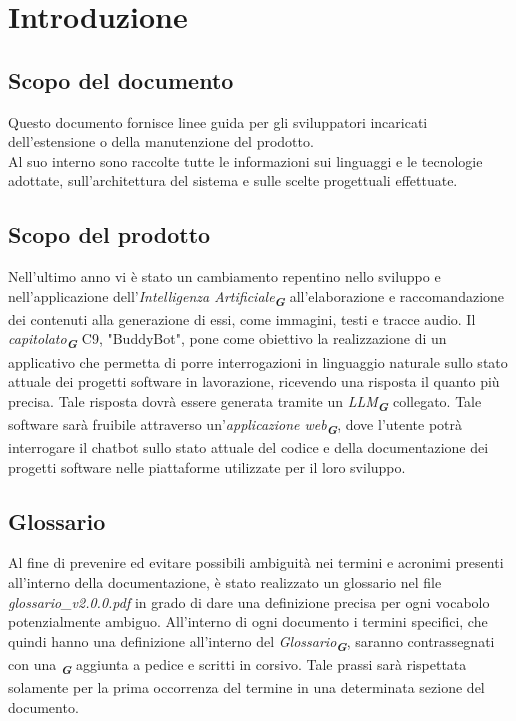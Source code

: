 

\section{Introduzione}
\label{sec:introduzione}

\subsection{Scopo del documento}
Questo documento fornisce linee guida per gli sviluppatori incaricati dell'estensione o della manutenzione del prodotto.\\
Al suo interno sono raccolte tutte le informazioni sui linguaggi e le tecnologie adottate, sull’architettura del sistema e sulle
scelte progettuali effettuate.

\subsection{Scopo del prodotto}
Nell’ultimo anno vi è stato un cambiamento repentino nello sviluppo e nell’applicazione
dell’\emph{Intelligenza Artificiale}\textsubscript{\textbf{\textit{G}}} all’elaborazione e raccomandazione dei contenuti alla
generazione
di essi, come immagini, testi e tracce audio.
Il \emph{capitolato}\textsubscript{\textbf{\textit{G}}} C9, "BuddyBot", pone come obiettivo la realizzazione di un applicativo che
permetta di porre interrogazioni in
linguaggio naturale sullo stato attuale dei progetti software in lavorazione, ricevendo una risposta il quanto più precisa. Tale
risposta dovrà essere generata tramite un \emph{LLM}\textsubscript{\textbf{\textit{G}}} collegato. Tale software sarà fruibile
attraverso un'\emph{applicazione web}\textsubscript{\textbf{\textit{G}}}, dove l'utente potrà interrogare il chatbot sullo stato
attuale del codice e della documentazione dei progetti software nelle piattaforme utilizzate per il loro sviluppo.

\subsection{Glossario}
Al fine di prevenire ed evitare possibili ambiguità nei termini e acronimi presenti all’interno della documentazione, è stato
realizzato un glossario nel file \emph{glossario\_v2.0.0.pdf} in grado di dare una definizione precisa per ogni vocabolo potenzialmente
ambiguo. All’interno di ogni documento i termini specifici, che quindi hanno una definizione all’interno del 
\emph{Glossario}\textsubscript{\textbf{\textit{G}}}, saranno
contrassegnati con una \textsubscript{\textbf{\textit{G}}} aggiunta a pedice e scritti in corsivo. Tale prassi sarà rispettata
solamente per la prima occorrenza del termine in una determinata sezione del documento.

